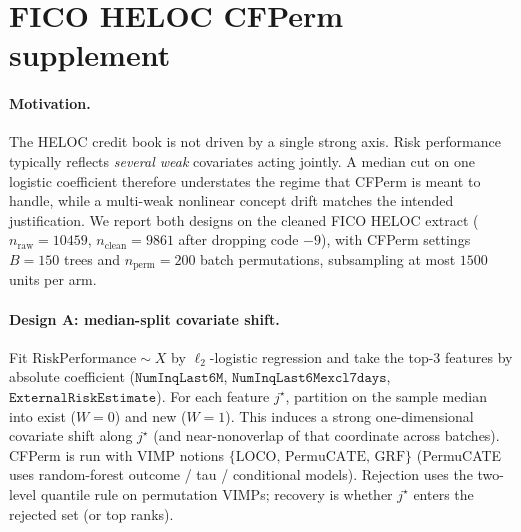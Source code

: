
\section{FICO HELOC CFPerm supplement}
\label{sec:fico-heloc-cfperm}

\paragraph{Motivation.}
The HELOC credit book is not driven by a single strong axis.
Risk performance typically reflects \emph{several weak} covariates acting jointly.
A median cut on one logistic coefficient therefore understates the regime that
CFPerm is meant to handle, while a multi-weak nonlinear concept drift matches
the intended justification.
We report both designs on the cleaned FICO HELOC extract
($n_{\mathrm{raw}}=10459$, $n_{\mathrm{clean}}=9861$ after dropping code $-9$),
with CFPerm settings $B=150$ trees and $n_{\mathrm{perm}}=200$ batch permutations,
subsampling at most $1500$ units per arm.

\paragraph{Design A: median-split covariate shift.}
Fit $\mathrm{RiskPerformance}\sim X$ by $\ell_2$-logistic regression and take the
top-$3$ features by absolute coefficient
($\mathtt{NumInqLast6M}$, $\mathtt{NumInqLast6Mexcl7days}$, $\mathtt{ExternalRiskEstimate}$).
For each feature $j^\star$, partition on the sample median into exist ($W=0$) and
new ($W=1$). This induces a strong one-dimensional covariate shift along $j^\star$
(and near-nonoverlap of that coordinate across batches).
CFPerm is run with VIMP notions
$\{\mathrm{LOCO},\,\mathrm{PermuCATE},\,\mathrm{GRF}\}$
(PermuCATE uses random-forest outcome / tau / conditional models).
Rejection uses the two-level quantile rule on permutation VIMPs;
recovery is whether $j^\star$ enters the rejected set (or top ranks).

